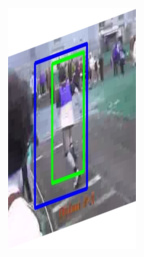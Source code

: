 \documentclass{report}
\begin{document}
\begin{figure}[h]
\begin{subfigure}{0.15\textwidth}
  \end{subfigure}
  \begin{subfigure}{0.15\textwidth}
    \includegraphics[width=\textwidth]{output/img_3.jpg}
  \end{subfigure}
  \begin{subfigure}{0.15\textwidth}

\end{subfigure}
\end{figure}
\end{document}
